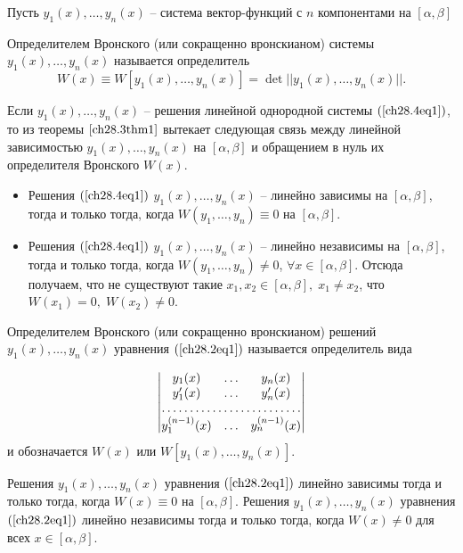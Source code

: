 Пусть $y_1(x), \ldots, y_n(x)$ -- система вектор-функций с $n$ компонентами на $[\alpha, \beta]$
\begin{defn}
Определителем Вронского (или сокращенно вронскианом) системы $y_1(x), \ldots, y_n(x)$ называется определитель
$$
W(x) \equiv W[y_1(x), \ldots, y_n(x)] = \det ||y_1(x), \ldots, y_n(x)||.
$$

Если $y_1(x), \ldots, y_n(x)$ -- решения линейной однородной системы $(\ref{ch28.4eq1})$, то из теоремы $\ref{ch28.3thm1}$ вытекает следующая связь между линейной зависимостью $y_1(x), \ldots, y_n(x)$ на $[\alpha, \beta]$ и обращением в нуль их определителя Вронского $W(x)$.

\begin{itemize}
\item
Решения $(\ref{ch28.4eq1})$ $y_1(x), \ldots, y_n(x)$ -- линейно зависимы на $[\alpha, \beta]$, тогда и только тогда, когда $W(y_1, \ldots, y_n) \equiv 0$ на $[\alpha, \beta]$.
\item
Решения $(\ref{ch28.4eq1})$ $y_1(x), \ldots, y_n(x)$ -- линейно независимы на $[\alpha, \beta]$, тогда и только тогда, когда $W(y_1, \ldots, y_n) \not= 0$, $\forall x \in [\alpha, \beta]$. Отсюда получаем, что не существуют такие $x_1, x_2 \in [\alpha, \beta], \; x_1 \not= x_2$, что $W(x_1) = 0, \; W(x_2) \not= 0$. 
\end{itemize}
\end{defn}

\begin{defn}
Определителем Вронского (или сокращенно вронскианом) решений $y_1(x), \ldots, y_n(x)$ уравнения $(\ref{ch28.2eq1})$ называется определитель вида

\begin{equation}
\begin{vmatrix}
y_1(x) & \ldots & y_n(x) \\
y'_1(x) & \ldots & y'_n(x) \\
\hdotsfor{3} \\
y^{(n - 1)}_1(x) & \ldots & y^{(n - 1)}_n(x)
\end{vmatrix}
\end{equation}
и обозначается $W(x)$ или $W[y_1(x), \ldots, y_n(x)]$.
\end{defn}

\begin{thm} \label{ch28.3thm3}
Решения $y_1(x), \ldots, y_n(x)$ уравнения $(\ref{ch28.2eq1})$ линейно зависимы тогда и только тогда, когда $W(x) \equiv 0$ на $[\alpha, \beta]$. Решения $y_1(x), \ldots, y_n(x)$ уравнения $(\ref{ch28.2eq1})$ линейно независимы тогда и только тогда, когда $W(x) \not= 0$ для всех $x \in [\alpha, \beta]$.
\end{thm}

